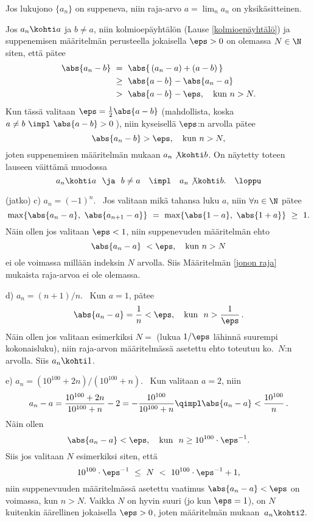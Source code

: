 \begin{Lause} \label{raja-arvon yksikäsitteisyys} Jos lukujono $\{a_n\}$ on suppeneva, niin 
raja-arvo $a = \lim_n a_n$ on yksikäsitteinen.
\end{Lause}
\tod Jos $a_n \kohti a$ ja $b \neq a$, niin kolmioepäyhtälön (Lause \ref{kolmioepäyhtälö}) ja 
suppenemisen määritelmän perusteella jokaisella $\eps>0$ on olemassa $N\in\N$ siten, että
pätee
\begin{align*}
\abs{a_n - b}\ &=\ \abs{\,(a_n - a) + (a-b)\,} \\
               &\ge\ \abs{a-b} - \abs{a_n - a} \\
               &>\ \abs{a-b} - \eps, \quad \text{kun}\ n > N.
\end{align*}
Kun tässä valitaan $\eps = \tfrac{1}{2}\abs{a-b}$ (mahdollista, koska 
$a \neq b\ \impl\ \abs{a-b} > 0\,$), niin kyseisellä $\eps$:n arvolla pätee
\[
\abs{a_n - b} > \eps, \quad \text{kun}\ n > N,
\]
joten suppenemisen määritelmän mukaan $a_n \not\kohti b$. On näytetty toteen lauseen
väittämä muodossa
\[
a_n \kohti a\ \ \ja\ \ b \neq a \quad \impl \quad a_n \not\kohti b. \quad \loppu
\]
\jatko \begin{Exa}(jatko) c) $a_n = (-1)^n$. \ Jos valitaan mikä tahansa luku $a$, niin 
$\forall n \in \N$ pätee
\[
\max \{\abs{a_n - a},\ \abs{a_{n+1} - a}\}\ =\ \max \{\abs{1-a},\ \abs{1+a}\}\ \ge\ 1.
\]
Näin ollen jos valitaan $\eps < 1$, niin suppenevuden määritelmän ehto
\[
\abs{a_n - a}\ < \eps, \quad \text{kun}\ n > N
\]
ei ole voimassa millään indeksin $N$ arvolla. Siis Määritelmän \ref{jonon raja} mukaista 
raja-arvoa ei ole olemassa.

d) $a_n = (n+1)/n$. \ Kun $a=1$, pätee
\[
\abs{a_n - a} = \frac{1}{n} < \eps, \quad \text{kun}\ \ n > \frac{1}{\eps}\,.
\]
Näin ollen jos valitaan esimerkiksi $N=$ (lukua $1/\eps$ lähinnä suurempi kokonaisluku),
niin raja-arvon määritelmässä asetettu ehto toteutuu ko.\ $N$:n arvolla. Siis
$a_n \kohti 1$.

e) $a_n = (10^{100}+2n)/(10^{100}+n)$. \ Kun valitaan $a=2$, niin
\[
a_n - a = \dfrac{10^{100}+2n}{10^{100}+n} - 2 
        = - \dfrac{10^{100}}{10^{100}+n} \qimpl \abs{a_n - a} < \frac{10^{100}}{n}\,.
\]
Näin ollen
\[
\abs{a_n - a} < \eps, \quad \text{kun}\ \ n \ge 10^{100} \cdot {\eps}^{-1}.
\]
Siis jos valitaan $N$ esimerkiksi siten, että
\[
10^{100} \cdot {\eps}^{-1}\ \le\ N\ <\ 10^{100} \cdot {\eps}^{-1} + 1,
\]
niin suppenevuuden määritelmässä asetettu vaatimus $\abs{a_n - a} < \eps$ on voimassa, kun 
$n > N$. Vaikka $N$ on hyvin suuri (jo kun $\eps=1$), on $N$ kuitenkin äärellinen jokaisella 
$\eps > 0$, joten määritelmän mukaan $\,a_n \kohti 2$. \loppu 
\end{Exa}

